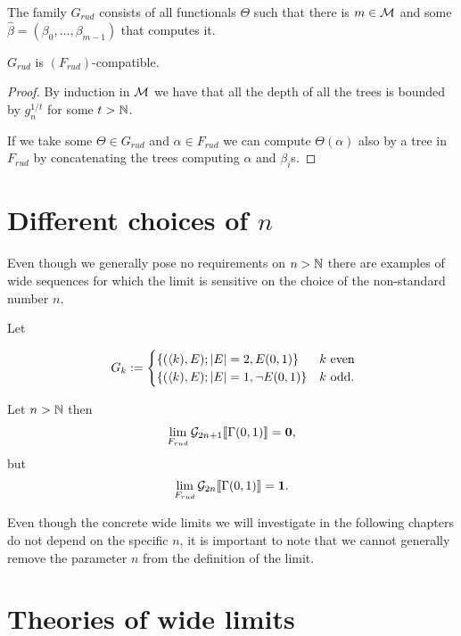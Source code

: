 \begin{defi}
The family $G_{rud}$ consists of all functionals $\Theta$ such that there is $m\in\mathcal{M}$ and some $\hat \beta=(\beta_0,\dots,\beta_{m-1})$ that computes it.
\end{defi}

\begin{lemm}
$G_{rud}$ is $(F_{rud})$-compatible.
\end{lemm}
\begin{proof}
By induction in $\mathcal{M}$ we have that all the depth of all the trees is bounded by $g_n^{1/t}$ for some $t>\mathbb{N}$.

If we take some $\Theta\in G_{rud}$ and $\alpha\in F_{rud}$ we can compute $\Theta(\alpha)$ also by a tree in $F_{rud}$ by concatenating the trees computing $\alpha$ and $\beta_i$s.
\end{proof}

\section{Different choices of $n$}

Even though we generally pose no requirements on $n>\mathbb{N}$ there are examples of wide sequences for which the limit is sensitive on the choice of the non-standard number $n$.

\begin{exam}
Let 

\[\
G_{k}:=
\begin{cases}
\{(\langle k),E);\left|{E}\right|=2,E(0,1)\}&\text{$k$ even}\\
\{(\langle k),E);\left|{E}\right|=1,\lnot E(0,1)\}&\text{$k$ odd.}\\
\end{cases}\]

Let $n>\mathbb{N}$ then
\begin{align}
\lim_{F_{rud}}\mathcal{G}_{2n+1} \llbracket \Gamma(0,1)\rrbracket =\textbf{0},
\end{align}
but
\begin{align}
\lim_{F_{rud}}\mathcal{G}_{2n}\llbracket \Gamma(0,1)\rrbracket=\textbf{1}.
\end{align}

Even though the concrete wide limits we will investigate in the following chapters do not depend on the specific $n$, it is important to note that we cannot generally remove the parameter $n$ from the definition of the limit.
\end{exam}

\section{Theories of wide limits}

